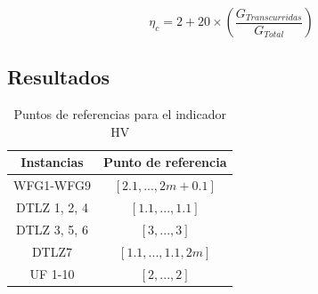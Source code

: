\begin{equation}\label{eqn:index_eta}
 \eta_c = 2 + 20 \times \left ( \frac{G_{Transcurridas}}{G_{Total}} \right)
\end{equation}

\subsection{Resultados}

\begin{table}[t]
\centering
\caption{Puntos de referencias para el indicador HV}
\label{tab:ReferencePoints}
\begin{scriptsize}
\begin{tabular}{cc}
\hline
\textbf{Instancias} & \textbf{Punto de referencia} \\ \hline
WFG1-WFG9 & $[2.1, ...,2m+0.1]$ \\
DTLZ 1, 2, 4 & $[1.1, ..., 1.1]$ \\
DTLZ 3, 5, 6 & $[3, ..., 3]$ \\
DTLZ7 & $[1.1, ..., 1.1, 2m]$ \\
UF 1-10 & $[2, ..., 2]$ \\ \hline
\end{tabular}
\end{scriptsize}
\end{table}


